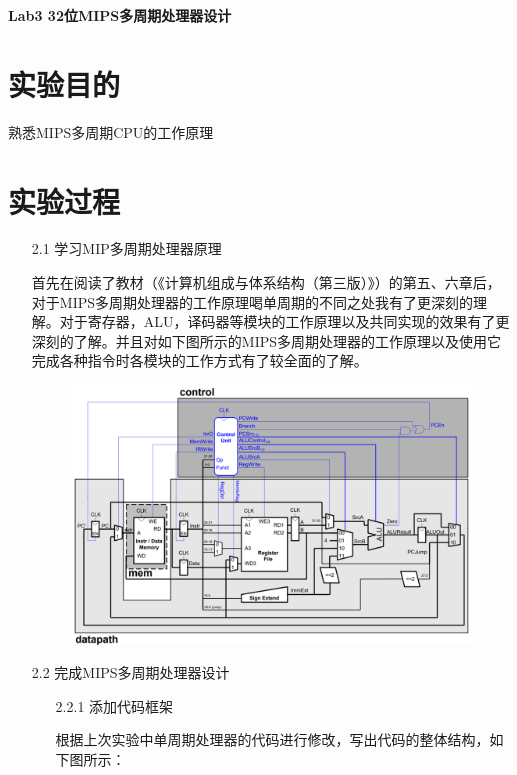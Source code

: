 \documentclass[UTF8]{article}
\begin{document}
	\begin{center}
	\textbf{{\huge Lab3 32位MIPS多周期处理器设计}}
	\end{center}
	\section{实验目的}
	\par 
	熟悉MIPS多周期CPU的工作原理
	\section{实验过程}
	\begin{enumerate}
		\item [2.1] 学习MIP多周期处理器原理
		\par 首先在阅读了教材（《计算机组成与体系结构（第三版）》）的第五、六章后，对于MIPS多周期处理器的工作原理喝单周期的不同之处我有了更深刻的理解。对于寄存器，ALU，译码器等模块的工作原理以及共同实现的效果有了更深刻的了解。并且对如下图所示的MIPS多周期处理器的工作原理以及使用它完成各种指令时各模块的工作方式有了较全面的了解。
		\begin{figure}[htbp]
			\centering
			\includegraphics[scale=0.5]{2-1.png}
		\end{figure}
		\item [2.2] 完成MIPS多周期处理器设计
			\begin{enumerate}
				\item [2.2.1] 添加代码框架
					\par 根据上次实验中单周期处理器的代码进行修改，写出代码的整体结构，如下图所示：
					\begin{figure}[htbp]
						\centering

\end{figure}
\end{enumerate}
\end{enumerate}
\end{document}
